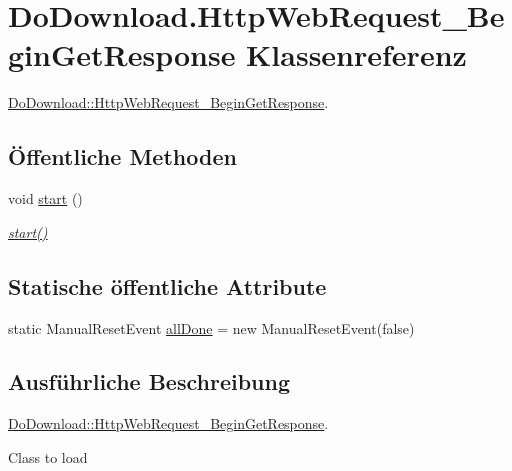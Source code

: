 \hypertarget{class_do_download_1_1_http_web_request___begin_get_response}{\section{Do\-Download.\-Http\-Web\-Request\-\_\-\-Begin\-Get\-Response Klassenreferenz}
\label{class_do_download_1_1_http_web_request___begin_get_response}
}


\hyperlink{class_do_download_1_1_http_web_request___begin_get_response}{Do\-Download\-::\-Http\-Web\-Request\-\_\-\-Begin\-Get\-Response}.  


\subsection*{Öffentliche Methoden}
\begin{DoxyCompactItemize}
\item 
void \hyperlink{class_do_download_1_1_http_web_request___begin_get_response_a606b2dabbf563182262cb028cd32c62b}{start} ()
\begin{DoxyCompactList}\small\item\em \hyperlink{class_do_download_1_1_http_web_request___begin_get_response_a606b2dabbf563182262cb028cd32c62b}{start()} \end{DoxyCompactList}\end{DoxyCompactItemize}
\subsection*{Statische öffentliche Attribute}
\begin{DoxyCompactItemize}
\item 
static Manual\-Reset\-Event \hyperlink{class_do_download_1_1_http_web_request___begin_get_response_a03670e4a51868848ede5ca7c7382066a}{all\-Done} = new Manual\-Reset\-Event(false)
\end{DoxyCompactItemize}


\subsection{Ausführliche Beschreibung}
\hyperlink{class_do_download_1_1_http_web_request___begin_get_response}{Do\-Download\-::\-Http\-Web\-Request\-\_\-\-Begin\-Get\-Response}. 

Class to load 

